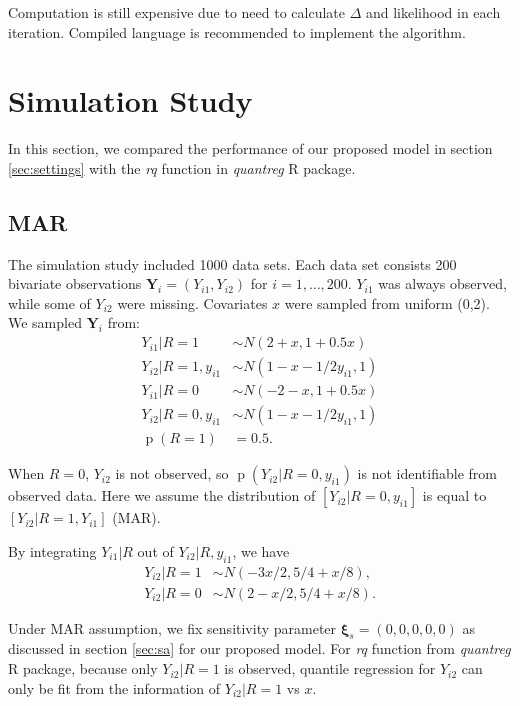 \documentclass[12pt]{article}
\DeclareMathOperator{\pr}{p}
\begin{document}
Computation is still expensive due to need to calculate $\Delta$ and
likelihood in each iteration. Compiled language is recommended to
implement the algorithm.

\section{Simulation Study}
\label{sec:simulation}
In this section, we compared the performance of our proposed 
model in section \ref{sec:settings}  with the \textit{rq} function in
\textit{quantreg} R package.

\subsection{MAR}

The simulation study included 1000 data sets. Each data set consists
200 bivariate observations $\bm Y_i = (Y_{i1}, Y_{i2})$ for $i = 1,
\ldots, 200$. $Y_{i1}$ was always observed, while some of $Y_{i2}$
were missing. Covariates $x$ were sampled from uniform (0,2). We
sampled $\bm Y_i$ from:
\begin{align*}
  Y_{i1} |R = 1 & \sim N ( 2 + x, 1 + 0.5x)\\
  Y_{i2} | R = 1, y_{i1} & \sim N(1 - x - 1/2y_{i1}, 1) \\
  Y_{i1}| R= 0 & \sim N(-2 - x, 1 + 0.5x) \\
  Y_{i2}| R= 0, y_{i1} & \sim N(1 - x - 1/2y_{i1}, 1) \\
  \pr (R = 1) & = 0.5.
\end{align*}

When $R = 0$, $Y_{i2}$ is not observed, so $\pr(Y_{i2}| R = 0,
y_{i1})$ is not identifiable from observed data. Here we assume the
distribution of $[Y_{i2} | R = 0, y_{i1}]$ is equal to $[Y_{i2}| R= 1,
Y_{i1}]$ (MAR).

By integrating $Y_{i1}|R$ out of $Y_{i2}|R, y_{i1}$, we have
\begin{align*}
  Y_{i2} | R = 1 & \sim N( - 3x/2, 5/4 + x/8), \\
  Y_{i2} | R = 0 & \sim N( 2 - x/2, 5/4 + x/8).
\end{align*}

Under MAR assumption, we fix sensitivity parameter $\bm \xi_s =
(0,0,0,0,0)$ as discussed in section \ref{sec:sa} for our proposed
model. For \textit{rq} function from \textit{quantreg} R package,
because only $Y_{i2}| R = 1$ is observed, quantile regression for
$Y_{i2}$ can only be fit from the information of $Y_{i2}|R = 1$ vs
$x$.
\end{document}
